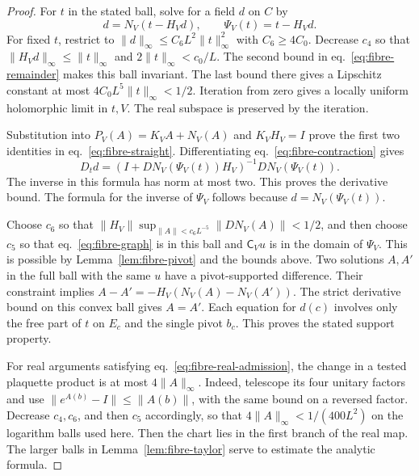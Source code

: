 \documentclass[11pt,letterpaper,reqno]{amsart}
\numberwithin{equation}{section}
\renewcommand{\eqref}[1]{\textup{eq.~\ref{#1}}}
\theoremstyle{definition}
\theoremstyle{remark}
\begin{document}
\begin{proof}
For $t$ in the stated ball, solve for a field $d$ on $C$ by
\begin{equation}\label{eq:fibre-contraction}
 d=N_V(t-H_Vd),\qquad \Psi_V(t)=t-H_Vd.
\end{equation}
For fixed $t$, restrict to $\|d\|_\infty\le C_6L^2\|t\|_\infty^2$ with
$C_6\ge4C_0$. Decrease $c_4$ so that $\|H_Vd\|_\infty\le\|t\|_\infty$ and
$2\|t\|_\infty<c_0/L$. The second bound in \eqref{eq:fibre-remainder} makes
this ball invariant. The last bound there gives a Lipschitz constant at most
$4C_0 L^5\|t\|_\infty<1/2$. Iteration from zero gives a locally uniform
holomorphic limit in $t,V$. The real subspace is preserved by the iteration.

Substitution into $P_V(A)=K_VA+N_V(A)$ and $K_VH_V=I$ prove the first two
identities in \eqref{eq:fibre-straight}. Differentiating
\eqref{eq:fibre-contraction} gives
\[
 D_td=(I+DN_V(\Psi_V(t))H_V)^{-1}DN_V(\Psi_V(t)).
\]
The inverse in this formula has norm at most two. This proves the derivative
bound. The formula for the inverse of $\Psi_V$ follows because
$d=N_V(\Psi_V(t))$.

Choose $c_6$ so that $\|H_V\|\sup_{\|A\|<c_6L^{-5}}\|DN_V(A)\|<1/2$, and then
choose $c_5$ so that \eqref{eq:fibre-graph} is in this ball and $\mathsf C_Vu$ is in the domain of $\Psi_V$. This is possible by
Lemma~\ref{lem:fibre-pivot} and the bounds above. Two solutions $A,A'$ in the
full ball with the same $u$ have a pivot-supported difference. Their
constraint implies $A-A'=-H_V(N_V(A)-N_V(A'))$. The strict derivative bound on
this convex ball gives $A=A'$. Each equation for $d(c)$ involves only the free
part of $t$ on $E_c$ and the single pivot $b_c$. This proves the stated
support property.

For real arguments satisfying \eqref{eq:fibre-real-admission}, the change in a
tested plaquette product is at most $4\|A\|_\infty$. Indeed, telescope its
four unitary factors and use $\|e^{A(b)}-I\|\le\|A(b)\|$, with the same bound
on a reversed factor. Decrease $c_4,c_6$, and then $c_5$ accordingly, so that
$4\|A\|_\infty<1/(400L^2)$ on
the logarithm balls used here. Then the chart lies in the first branch of the
real map. The larger balls in Lemma~\ref{lem:fibre-taylor} serve to estimate
the analytic formula.
\end{proof}
\end{document}
